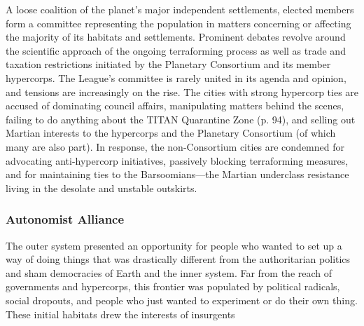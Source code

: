 A loose coalition of the planet's major independent settlements,
elected members form a committee representing the population in
matters concerning or affecting the majority of its habitats and
settlements.  Prominent debates revolve around the scientific approach
of the ongoing terraforming process as well as trade and taxation
restrictions initiated by the Planetary Consortium and its member
hypercorps.  The League's committee is rarely united in its agenda and
opinion, and tensions are increasingly on the rise.  The cities with
strong hypercorp ties are accused of dominating council affairs,
manipulating matters behind the scenes, failing to do anything about
the TITAN Quarantine Zone (p. 94), and selling out Martian interests
to the hypercorps and the Planetary Consortium (of which many are also
part). In response, the non-Consortium cities are condemned for
advocating anti-hypercorp initiatives, passively blocking terraforming
measures, and for maintaining ties to the Barsoomians—the Martian
underclass resistance living in the desolate and unstable outskirts.

\subsubsection{Autonomist Alliance}
\label{sec:autonomist-alliance}

The outer system presented an opportunity for people who wanted to set
up a way of doing things that was drastically different from the
authoritarian politics and sham democracies of Earth and the inner
system.  Far from the reach of governments and hypercorps, this
frontier was populated by political radicals, social dropouts, and
people who just wanted to experiment or do their own thing. These
initial habitats drew the interests of insurgents






